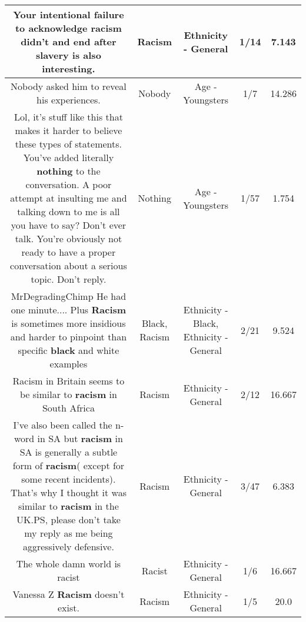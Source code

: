 \documentclass[11pt]{article}
\newlength\mylength
\begin{document}
\begin{center}
\begin{longtable}{|C{.65\mylength}|C{.30\mylength}|C{.12\mylength}|C{.12\mylength}|C{.12\mylength}|}
  \small Your intentional failure to acknowledge \textbf{racism} didn't and end after slavery is also interesting.\normalsize   & Racism & Ethnicity - General & 1/14 & 7.143 \\  \hline
  \small Nobody asked him to reveal his experiences.\normalsize   & Nobody & Age - Youngsters & 1/7 & 14.286 \\  \hline
  \small Lol, it's stuff like this that makes it harder to believe these types of statements. You've added literally \textbf{nothing} to the conversation. A poor attempt at insulting me and talking down to me is all you have to say? Don't ever talk. You're obviously not ready to have a proper conversation about a serious topic. Don't reply.\normalsize   & Nothing & Age - Youngsters & 1/57 & 1.754 \\  \hline
  \small MrDegradingChimp He had one minute.... Plus \textbf{Racism} is sometimes more insidious and harder to pinpoint than specific \textbf{black} and white examples\normalsize   & Black, Racism & Ethnicity - Black, Ethnicity - General & 2/21 & 9.524 \\  \hline
  \small Racism in Britain seems to be similar to \textbf{racism} in South Africa\normalsize   & Racism & Ethnicity - General & 2/12 & 16.667 \\  \hline
  \small I've also been called the n-word in SA but \textbf{racism} in SA is generally a subtle form of \textbf{racism}( except for some recent incidents). That's why I thought it was similar to \textbf{racism} in the UK.PS, please don't take my reply as me being aggressively defensive.\normalsize   & Racism & Ethnicity - General & 3/47 & 6.383 \\  \hline
  \small The whole damn world is racist\normalsize   & Racist & Ethnicity - General & 1/6 & 16.667 \\  \hline
  \small Vanessa Z \textbf{Racism} doesn't exist.\normalsize   & Racism & Ethnicity - General & 1/5 & 20.0 \\  \hline

\end{longtable}
\end{center}
\end{document}
